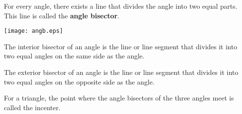 \documentclass[12pt]{article}
\begin{document}
For every angle, there exists a line that divides the angle into two equal parts.
This line is called the \textbf{angle bisector}.

\begin{center}
\texttt{[image: angb.eps]}
\end{center}

The interior bisector of an angle is the line or line segment that divides it into two equal angles on the same side as the angle.

The exterior bisector of an angle is the line or line segment that divides it into two equal angles on the opposite side as the angle.

For a triangle, the point where the angle bisectors of the three angles meet is called the incenter.
\end{document}
